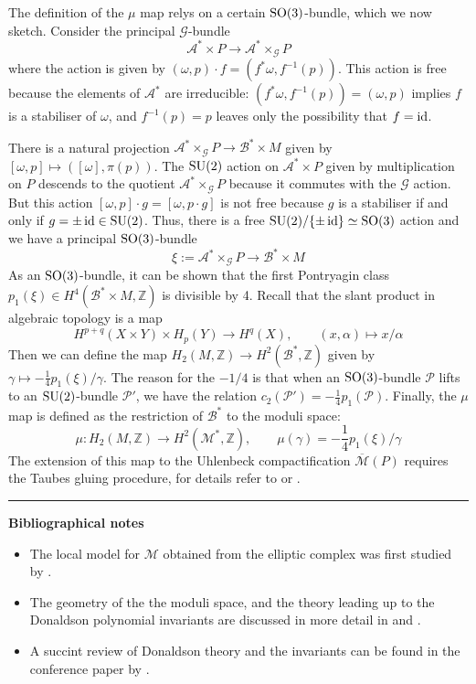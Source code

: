 The definition of the $\mu$ map relys on a certain $\operatorname{SO}(3)$-bundle, which we now
sketch.  Consider the principal $\mathcal{G}$-bundle
\[
\mathcal{A}^* \times P  \to \mathcal{A}^* \times_\mathcal{G} P 
\]
where the action is given by $(\omega,p)\cdot f = (f^*\omega, f^{-1}(p))$.
This action is free because the elements of $\mathcal{A}^*$ are irreducible:
$(f^*\omega,f^{-1}(p)) = (\omega,p)$ implies $f$ is a stabiliser of  $\omega$,
and  $f^{-1}(p)=p$ leaves only the possibility that $f=\operatorname{id}$.

There is a natural projection $\mathcal{A}^* \times_\mathcal{G} P \to
\mathcal{B}^*\times M$ given by $[\omega,p] \mapsto ([\omega],\pi(p))$.
The $\operatorname{SU}(2)$ action on  $\mathcal{A}^*\times P$ given by multiplication on $P$
descends to the quotient $\mathcal{A}^* \times_\mathcal{G} P$ because it 
commutes with the  $\mathcal{G}$ action.
But this action $[\omega,p]\cdot g = [\omega,p\cdot g]$ is not free because 
$g$ is a stabiliser if and only if $g=\pm \operatorname{id}\in \operatorname{SU}(2)$. Thus, there is a free
$\operatorname{SU}(2) /\{\pm\operatorname{id}\} \simeq \operatorname{SO}(3)$ action and we have a principal $\operatorname{SO}(3)$-bundle
\[
\xi := \mathcal{A}^*\times_{\mathcal{G}} P \to \mathcal{B}^*\times M
\] 
As an $\operatorname{SO}(3)$-bundle, it can be shown that the first Pontryagin class
$p_1(\xi) \in H^4(\mathcal{B}^*\times M,\mathbb{Z})$ is divisible by
4.\cite[Lemma 7.2.1]{morgan} 
Recall that the slant product in algebraic topology is a map 
\[
H^{p+q}(X\times Y) \times H_p(Y) \to H^q(X), \qquad 
(x,\alpha) \mapsto x / \alpha
\] 
Then we can define the map $H_2(M,\mathbb{Z})\to H^2(\mathcal{B}^*,\mathbb{Z})$
given by $\gamma \mapsto -\frac{1}{4} p_1(\xi) / \gamma$. 
The reason for the $-1 /4$ is
that when an $\operatorname{SO}(3)$-bundle $\mathcal{P}$ lifts  to an $\operatorname{SU}(2)$-bundle
$\mathcal{P}'$, we have the relation %
$c_2(\mathcal{P}')=-\frac{1}{4}p_1(\mathcal{P})$. Finally, the $\mu$ map is
defined as the restriction of $\mathcal{B}^*$ to the moduli space:
 \[
\mu : H_2(M,\mathbb{Z}) \to H^2(\mathcal{M}^*,\mathbb{Z}),\qquad
\mu(\gamma) = -\frac{1}{4}p_1(\xi) /\gamma
\] 
The extension of this map to the Uhlenbeck compactification 
$\overline{\mathcal{M}}(P)$ requires the Taubes
gluing procedure, for details refer to \cite{morgan} or \cite{donaldson_kronheimer}.




\vspace{5mm}
\hrule 
\vspace{5mm}

\textbf{Bibliographical notes}
{\small
\begin{itemize}
	\item The local model for $\mathcal{M}$ obtained from the elliptic complex 
		was first studied by \citet{local_moduli}.
	\item The geometry of the the moduli space, and the theory leading up to the
		Donaldson polynomial invariants are
		discussed in more detail in \citet{morgan} and
		\citet{donaldson_kronheimer}. 
	\item A succint review of Donaldson theory and the invariants can be found
		in the conference paper by \citet{naber_donaldson}.
\end{itemize}
}
